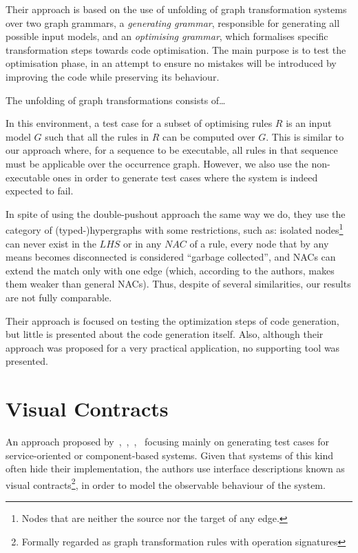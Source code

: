 Their approach is based on the use of unfolding of graph transformation systems~\cite{Ribeiro1996} over two graph grammars, a \textit{generating grammar}, responsible for generating all possible input models, and an \textit{optimising grammar}, which formalises specific transformation steps towards code optimisation.
The main purpose is to test the optimisation phase, in an attempt to ensure no mistakes will be introduced by improving the code while preserving its behaviour.

The unfolding of graph transformations consists of\ldots

In this environment, a test case for a subset of optimising rules $R$ is an input model $G$ such that all the rules in $R$ can be computed over $G$. This is similar to our approach where, for a sequence to be executable, all rules in that sequence must be applicable over the occurrence graph. However, we also use the non-executable ones in order to generate test cases where the system is indeed expected to fail.

In spite of using the double-pushout approach the same way we do, they use the category of (typed-)hypergraphs with some restrictions, such as: isolated nodes\footnote{ Nodes that are neither the source nor the target of any edge.} can never exist in the $LHS$ or in any $NAC$ of a rule, every node that by any means becomes disconnected is considered ``garbage collected'', and NACs can extend the match only with one edge (which, according to the authors, makes them weaker than general NACs).
Thus, despite of several similarities, our results are not fully comparable.

Their approach is focused on testing the optimization steps of code generation, but little is presented about the code generation itself. Also, although their approach was proposed for a very practical application, no supporting tool was presented.



\section{Visual Contracts}

An approach proposed by~\cite{Heckel2011},~\cite{Khan2012},~\cite{Khan2012a},~\cite{Runge2013} focusing mainly on generating test cases for service-oriented or component-based systems. Given that systems of this kind often hide their implementation, the authors use interface descriptions known as visual contracts\footnote{ Formally regarded as graph transformation rules with operation signatures}, in order to model the observable behaviour of the system.

